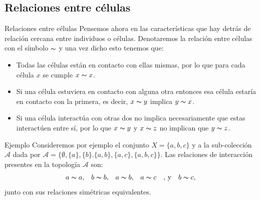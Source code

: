 \documentclass[9pt]{beamer}
\begin{document}
\subsection{Relaciones entre células}
\begin{frame}{Relaciones entre células}
Pensemos ahora en las características que hay detrás de relación cercana entre individuos o células. Denotaremos la relación entre células con el símbolo $\thicksim$ y una vez dicho esto tenemos que:

\begin{itemize}
    \item Todas las células están en contacto con ellas mismas, por lo que para cada célula $x$ se cumple $x \thicksim x$.
    \item Si una célula estuviera en contacto con alguna otra entonces esa célula estaría en contacto con la primera, es decir, $x\thicksim y$ implica $y\thicksim x$.
    \item Si una célula interactúa con otras dos no implica necesariamente que estas interactúen entre sí, por lo que $x\thicksim y$ y $x\thicksim z$ no implican que $y\thicksim z$.
\end{itemize}

\begin{exampleblock}{Ejemplo}
Consideremos por ejemplo el conjunto $X=\{a,b,c\}$ y a la sub-colección $\mathcal{A}$ dada por $\mathcal{A}=\{\emptyset,\{a\},\{b\}.\{a,b\},\{a,c\},\{a,b,c\}\}$. Las relaciones de interacción presentes en la topología $\mathcal{A}$ son:
$$\begin{array}{cccccc}
    a\thicksim a, & b\thicksim b, & a\thicksim b, & a\thicksim c & \text{, y} & b\thicksim c,
\end{array}$$
junto con sus relaciones simétricas equivalentes.
\end{exampleblock}
\end{frame}
\end{document}
